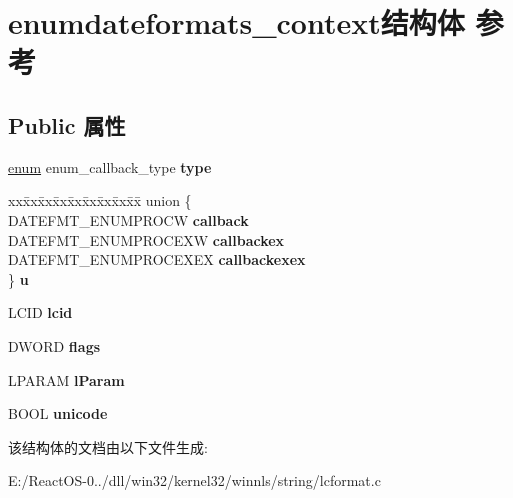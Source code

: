 \hypertarget{structenumdateformats__context}{}\section{enumdateformats\+\_\+context结构体 参考}
\label{structenumdateformats__context}
\subsection*{Public 属性}
\begin{DoxyCompactItemize}
\item 
\mbox{\label{structenumdateformats__context_abb0d35d8b8e3ee93a734e3175386ae11}} 
\hyperlink{interfaceenum}{enum} enum\+\_\+callback\+\_\+type {\bfseries type}
\item 
\mbox{\label{structenumdateformats__context_a66ef0c509b37def3022acb705b204fc4}} 
\begin{tabbing}
xx\=xx\=xx\=xx\=xx\=xx\=xx\=xx\=xx\=\kill
union \{\\
\>DATEFMT\_ENUMPROCW {\bfseries callback}\\
\>DATEFMT\_ENUMPROCEXW {\bfseries callbackex}\\
\>DATEFMT\_ENUMPROCEXEX {\bfseries callbackexex}\\
\} {\bfseries u}\\

\end{tabbing}\item 
\mbox{\label{structenumdateformats__context_a10a5333bfb22a80fcbc6f5dbb6b66d20}} 
L\+C\+ID {\bfseries lcid}
\item 
\mbox{\label{structenumdateformats__context_a368691b271af904d41ee680509e83c64}} 
D\+W\+O\+RD {\bfseries flags}
\item 
\mbox{\label{structenumdateformats__context_aa0307219b061a78568f20e8bd52186f2}} 
L\+P\+A\+R\+AM {\bfseries l\+Param}
\item 
\mbox{\label{structenumdateformats__context_a9a3bb72ef9689c52ee8b8266819f50e8}} 
B\+O\+OL {\bfseries unicode}
\end{DoxyCompactItemize}


该结构体的文档由以下文件生成\+:\begin{DoxyCompactItemize}
\item 
E\+:/\+React\+O\+S-\/0../dll/win32/kernel32/winnls/string/lcformat.\+c\end{DoxyCompactItemize}
